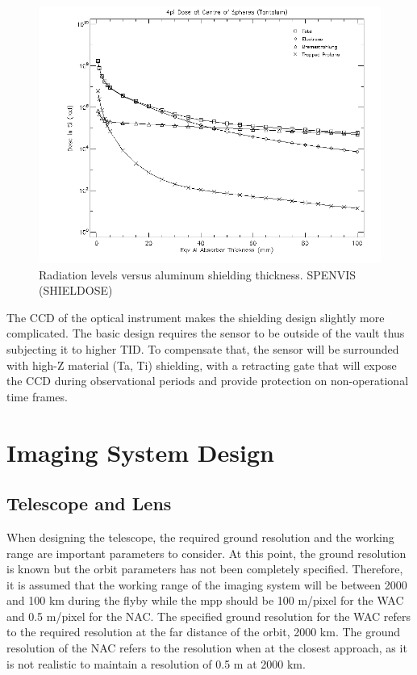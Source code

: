 \begin{figure}[htb!]
\centering
\includegraphics[scale=0.4]{figures/Orbiter/alvsrad.png}
\caption{Radiation levels versus aluminum shielding thickness. SPENVIS (SHIELDOSE)}
\label{fig:shield}
\end{figure}
The CCD of the optical instrument makes the shielding design slightly more complicated. The basic design requires the sensor to be outside of the vault thus subjecting it to higher TID. To compensate that, the sensor will be surrounded with high-Z material (Ta, Ti) shielding, with a retracting gate that will expose the CCD during observational periods and provide protection on non-operational time frames.

\newpage
\section{Imaging System Design}
\subsection{Telescope and Lens}
When designing the telescope, the required ground resolution and the working range are important parameters to consider. At this point, the ground resolution is known but the orbit parameters has not been completely specified. Therefore, it is assumed that the working range of the imaging system will be between 2000 and 100 km during the flyby while the mpp should be 100 m/pixel for the WAC and 0.5 m/pixel for the NAC.
The specified ground resolution for the WAC refers to the required resolution at the far distance of the orbit, 2000 km. The ground resolution of the NAC refers to the resolution when at the closest approach, as it is not realistic to maintain a resolution of 0.5 m at 2000 km. 

